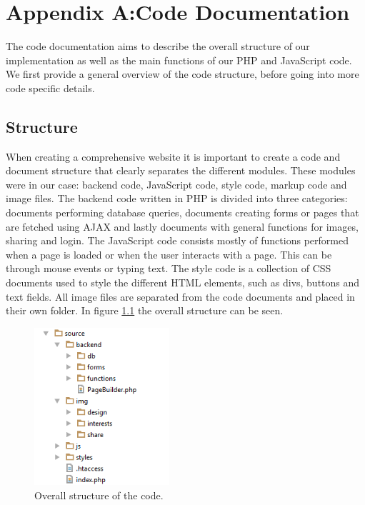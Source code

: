 \chapter{Appendix A:\newline Code Documentation}
\label{apx:Code}

The code documentation aims to describe the overall structure of our implementation as well as the main functions of our PHP and JavaScript code. We first provide a general overview of the code structure, before going into more code specific details. 

\section{Structure}
\label{sec:CodeStructure}
When creating a comprehensive website it is important to create a code and document structure that clearly separates the different modules. These modules were in our case: backend code, JavaScript code, style code, markup code and image files. The backend code written in PHP is divided into three categories: documents performing database queries, documents creating forms or pages that are fetched using AJAX and lastly documents with general functions for images, sharing and login. The JavaScript code consists mostly of functions performed when a page is loaded or when the user interacts with a page. This can be through mouse events or typing text. The style code is a collection of CSS documents used to style the different HTML elements, such as divs, buttons and text fields. All image files are separated from the code documents and placed in their own folder. In figure \ref{fig:CodeStructureStruc} the overall structure can be seen.

\begin{figure}[ht!]
  \centering
  \includegraphics[width=50mm]{./Appendix/CodeDocumentation/img/structure}
  \caption{Overall structure of the code.}
  \label{fig:CodeStructureStruc}
\end{figure}

